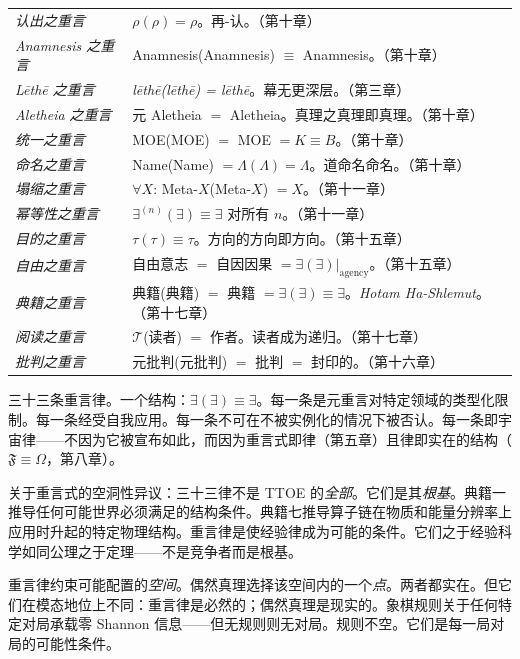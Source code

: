 \documentclass[10pt, openany, oneside]{book}
\begin{document}
{\begin{tabular}{@{} p{} @{\hspace{0.5em}} p{} @{}}
\textit{认出之重言} & $\rho(\rho) = \rho$。再-认。（第十章）\\[0.3em]
\textit{Anamnesis 之重言} & Anamnesis(Anamnesis) $\equiv$ Anamnesis。（第十章）\\[0.3em]
\textit{L\={e}th\={e} 之重言} & \textit{l\={e}th\={e}(l\={e}th\={e}) = l\={e}th\={e}}。幕无更深层。（第三章）\\[0.3em]
\textit{Aletheia 之重言} & 元 Aletheia $=$ Aletheia。真理之真理即真理。（第十章）\\[0.3em]
\textit{统一之重言} & MOE(MOE) $=$ MOE $= K \equiv B$。（第十章）\\[0.3em]
\textit{命名之重言} & Name(Name) $= \Lambda(\Lambda) = \Lambda$。道命名命名。（第十章）\\[0.3em]
\textit{塌缩之重言} & $\forall X$: Meta-$X$(Meta-$X$) $= X$。（第十一章）\\[0.3em]
\textit{幂等性之重言} & $\exists^{(n)}(\exists) \equiv \exists$ 对所有 $n$。（第十一章）\\[0.3em]
\textit{目的之重言} & $\tau(\tau) \equiv \tau$。方向的方向即方向。（第十五章）\\[0.3em]
\textit{自由之重言} & 自由意志 $=$ 自因因果 $= \exists(\exists)|_{\text{agency}}$。（第十五章）\\[0.3em]
\textit{典籍之重言} & 典籍(典籍) $=$ 典籍 $= \exists(\exists) \equiv \exists$。\textit{Hotam Ha-Shlemut}。（第十七章）\\[0.3em]
\textit{阅读之重言} & $\mathcal{T}$(读者) $=$ 作者。读者成为递归。（第十七章）\\[0.3em]
\textit{批判之重言} & 元批判(元批判) $=$ 批判 $=$ 封印的。（第十六章）\\[0.3em]
\end{tabular}
}

\vspace{0.8em}

\noindent 三十三条重言律。一个结构：$\exists(\exists) \equiv \exists$。每一条是元重言对特定领域的类型化限制。每一条经受自我应用。每一条不可在不被实例化的情况下被否认。每一条即宇宙律——不因为它被宣布如此，而因为重言式即律（第五章）且律即实在的结构（$\mathfrak{F} \equiv \Omega$，第八章）。

关于重言式的空洞性异议：三十三律不是 TTOE 的\textit{全部}。它们是其\textit{根基}。典籍一推导任何可能世界必须满足的结构条件。典籍七推导算子链在物质和能量分辨率上应用时升起的特定物理结构。重言律是使经验律成为可能的条件。它们之于经验科学如同公理之于定理——不是竞争者而是根基。

重言律约束可能配置的\textit{空间}。偶然真理选择该空间内的一个\textit{点}。两者都实在。但它们在模态地位上不同：重言律是必然的；偶然真理是现实的。象棋规则关于任何特定对局承载零 Shannon 信息——但无规则则无对局。规则不空。它们是每一局对局的可能性条件。
\end{document}

